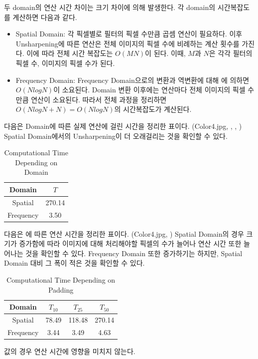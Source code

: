 \documentclass{report}
\begin{document}
두 domain의 연산 시간 차이는  크기 차이에 의해 발생한다.
각 domain의 시간복잡도를 계산하면 다음과 같다.

\begin{itemize}
    \item Spatial Domain: 각 픽셀별로 필터의 픽셀 수만큼 곱셈 연산이 필요하다.
    이후 Unsharpening에 따른 연산은 전체 이미지의 픽셀 수에 비례하는 계산 횟수를 가진다.
    이에 따라 전체 시간 복잡도는 $O(MN)$이 된다.
    이때, $M$과 $N$은 각각 필터의 픽셀 수, 이미지의 픽셀 수가 된다.

    \item Frequency Domain: Frequency Domain으로의 변환과 역변환에 대해 에 의하면 $O(NlogN)$이 소요된다.
    Domain 변환 이후에는 연산마다 전체 이미지의 픽셀 수만큼 연산이 소요된다.
    따라서 전체 과정을 정리하면 $O(NlogN + N) = O(NlogN)$의 시간복잡도가 계산된다.
\end{itemize}

다음은 Domain에 따른 실제 연산에 걸린 시간을 정리한 표이다. (Color4.jpg, , , )
Spatial Domain에서의 Unsharpening이 더 오래걸리는 것을 확인할 수 있다.

\begin{table}[h]
    \centering
    \begin{tabular}{@{}cc@{}}
        \hline
        Domain & $T$ \\
        \hline
        Spatial & 270.14 \\
        Frequency & 3.50 \\
        \hline
    \end{tabular}
    \caption{Computational Time Depending on Domain}
\end{table}

다음은 에 따른 연산 시간을 정리한 표이다. (Color4.jpg, )
Spatial Domain의 경우  크기가 증가함에 따라 이미지에 대해 처리해야할 픽셀의 수가 늘어나 연산 시간 또한 늘어나는 것을 확인할 수 있다.
Frequency Domain 또한 증가하기는 하지만, Spatial Domain 대비 그 폭이 적은 것을 확인할 수 있다.

\begin{table}[h]
    \centering
    \begin{tabular}{@{}cccc@{}}
        \hline
        Domain & $T_{10}$ & $T_{25}$ & $T_{50}$ \\
        \hline
        Spatial & 78.49 & 118.48 & 270.14 \\
        Frequency & 3.44 & 3.49 & 4.63 \\
        \hline
    \end{tabular}
    \caption{Computational Time Depending on Padding}
\end{table}

 값의 경우 연산 시간에 영향을 미치지 않는다.
\end{document}

